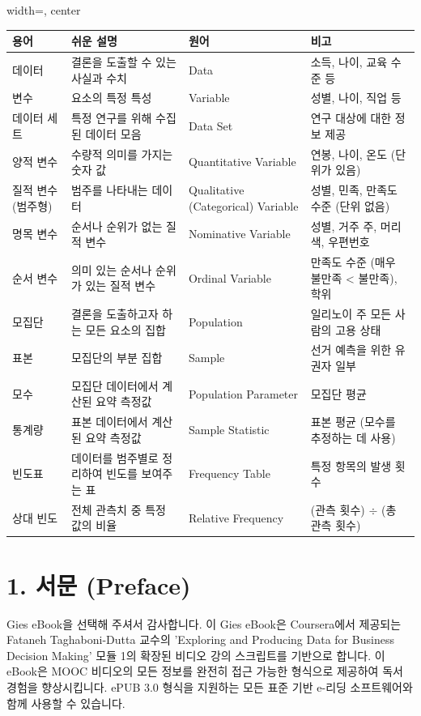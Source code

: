 \documentclass[11pt,a4paper]{book}
\theoremstyle{definition}
\begin{document}
\begin{adjustbox}{width=\textwidth, center}
\begin{tabular}{llll}
\toprule
\textbf{용어} & \textbf{쉬운 설명} & \textbf{원어} & \textbf{비고} \\
\midrule
데이터 & 결론을 도출할 수 있는 사실과 수치 & Data & 소득, 나이, 교육 수준 등 \\
변수 & 요소의 특정 특성 & Variable & 성별, 나이, 직업 등 \\
데이터 세트 & 특정 연구를 위해 수집된 데이터 모음 & Data Set & 연구 대상에 대한 정보 제공 \\
양적 변수 & 수량적 의미를 가지는 숫자 값 & Quantitative Variable & 연봉, 나이, 온도 (단위가 있음) \\
질적 변수 (범주형) & 범주를 나타내는 데이터 & Qualitative (Categorical) Variable & 성별, 민족, 만족도 수준 (단위 없음) \\
명목 변수 & 순서나 순위가 없는 질적 변수 & Nominative Variable & 성별, 거주 주, 머리색, 우편번호 \\
순서 변수 & 의미 있는 순서나 순위가 있는 질적 변수 & Ordinal Variable & 만족도 수준 (매우 불만족 < 불만족), 학위 \\
모집단 & 결론을 도출하고자 하는 모든 요소의 집합 & Population & 일리노이 주 모든 사람의 고용 상태 \\
표본 & 모집단의 부분 집합 & Sample & 선거 예측을 위한 유권자 일부 \\
모수 & 모집단 데이터에서 계산된 요약 측정값 & Population Parameter & 모집단 평균 \\
통계량 & 표본 데이터에서 계산된 요약 측정값 & Sample Statistic & 표본 평균 (모수를 추정하는 데 사용) \\
빈도표 & 데이터를 범주별로 정리하여 빈도를 보여주는 표 & Frequency Table & 특정 항목의 발생 횟수 \\
상대 빈도 & 전체 관측치 중 특정 값의 비율 & Relative Frequency & (관측 횟수) $\div$ (총 관측 횟수) \\
\bottomrule
\end{tabular}
\end{adjustbox}


\section{1. 서문 (Preface)}

Gies eBook을 선택해 주셔서 감사합니다. 이 Gies eBook은 Coursera에서 제공되는 Fataneh Taghaboni-Dutta 교수의 'Exploring and Producing Data for Business Decision Making' 모듈 1의 확장된 비디오 강의 스크립트를 기반으로 합니다. 이 eBook은 MOOC 비디오의 모든 정보를 완전히 접근 가능한 형식으로 제공하여 독서 경험을 향상시킵니다. ePUB 3.0 형식을 지원하는 모든 표준 기반 e-리딩 소프트웨어와 함께 사용할 수 있습니다.
\end{document}
